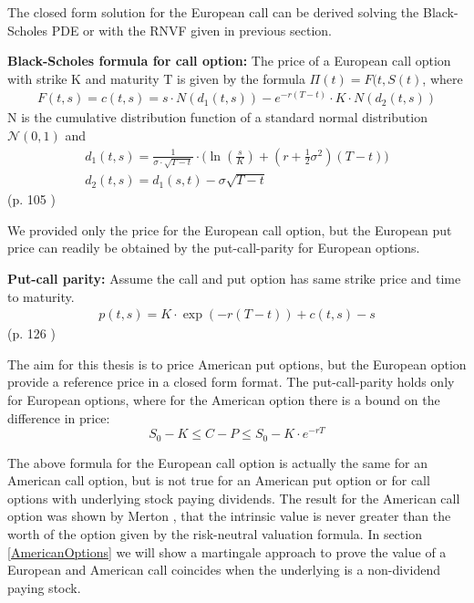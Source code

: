 The closed form solution for the European call can be derived solving the Black-Scholes PDE or with the RNVF given in previous section. 
\theoremstyle{proposition}
\begin{proposition}{}\label{BS-price-EuroCall}
\textbf{Black-Scholes formula for call option: } The price of a European call option with strike K and maturity T is given by the formula  $\Pi(t)=F(t,S(t)$, where
\begin{align*}
F(t,s)=c(t,s)=s \cdot N(d_1(t,s)) - e^{-r(T-t)}\cdot K \cdot N(d_2(t,s))
\end{align*}
N is the cumulative distribution function of a standard normal distribution $\mathcal{N}(0,1)$ and
\begin{align*}
d_1(t,s)=\frac{1}{\sigma\cdot \sqrt{T-t}} \cdot \bigg( \ln(\frac{s}{K}) + (r+\frac{1}{2} \sigma^2) (T-t) \bigg)\\
d_2(t,s)=d_1(s,t)-\sigma \sqrt{T-t}
\end{align*}
\null \hfill (p. 105 \parencite{finKont})
\end{proposition}
We provided only the price for the European call option, but the European put price can readily be obtained by the put-call-parity for European options.

\theoremstyle{proposition}
\begin{proposition}{}\label{put-call-parity}
\textbf{Put-call parity: } 
Assume the call and put option has same strike price and time to maturity.
\begin{align*}
p(t,s)=K\cdot \exp(-r(T-t))+c(t,s)-s
\end{align*}
\null \hfill (p. 126 \parencite{finKont})
\end{proposition}

The aim for this thesis is to price American put options, but the European option provide a reference price in a closed form format. The put-call-parity holds only for European options, where for the American option there is a bound on the difference in price:
$$S_0 - K \leq C-P \leq S_0 - K \cdot e^{-rT}$$

The above formula for the European call option is actually the same for an American call option, but is not true for an American put option or for call options with underlying stock paying dividends. The result for the American call option was shown by Merton \parencite{Merton73}, that the intrinsic value is never greater than the worth of the option given by the risk-neutral valuation formula. In section \ref{AmericanOptions} we will show a martingale approach to prove the value of a European and American call coincides when the underlying is a non-dividend paying stock.

